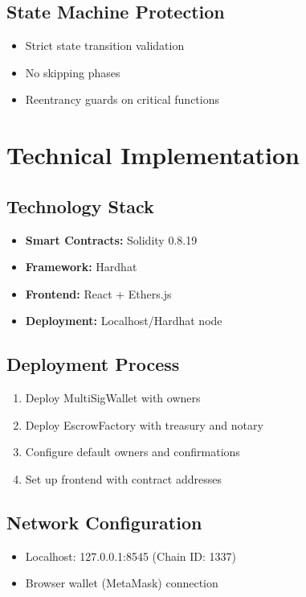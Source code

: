 \documentclass[12pt,a4paper]{article}
\begin{document}
\subsection{State Machine Protection}
\begin{itemize}
\item Strict state transition validation
\item No skipping phases
\item Reentrancy guards on critical functions
\end{itemize}

\section{Technical Implementation}

\subsection{Technology Stack}
\begin{itemize}
\item \textbf{Smart Contracts:} Solidity 0.8.19
\item \textbf{Framework:} Hardhat
\item \textbf{Frontend:} React + Ethers.js
\item \textbf{Deployment:} Localhost/Hardhat node
\end{itemize}

\subsection{Deployment Process}
\begin{enumerate}
\item Deploy MultiSigWallet with owners
\item Deploy EscrowFactory with treasury and notary
\item Configure default owners and confirmations
\item Set up frontend with contract addresses
\end{enumerate}

\subsection{Network Configuration}
\begin{itemize}
\item Localhost: 127.0.0.1:8545 (Chain ID: 1337)
\item Browser wallet (MetaMask) connection
\end{itemize}
\end{document}
